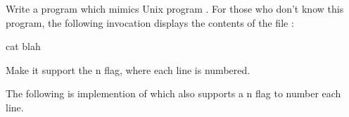 \begin{Exercise}[title={Cat},difficulty=6]
\label{ex:cat}
\Question \label{ex:cat q1} Write a program which mimics Unix program
. For those who don't know this program, the following 
invocation displays the contents of the file :
\begin{display}
\pr cat blah
\end{display}

\Question Make it support the \-n flag, where each line is
numbered.

\end{Exercise}

\begin{Answer}
\Question The following is implemention of  which also 
supports a \-n flag to number each line.

\showremarks
\end{Answer}
